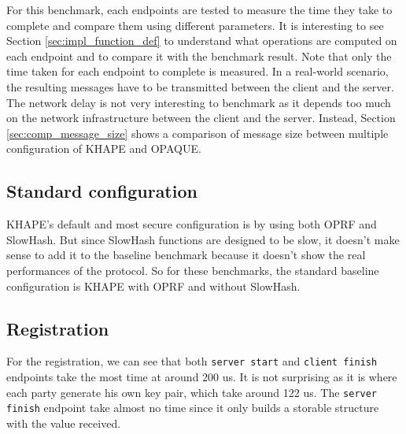 ﻿\documentclass[../report.tex]{subfiles}
\begin{document}
For this benchmark, each endpoints are tested to measure the time they take to complete and compare them using different parameters. 
It is interesting to see Section \ref{sec:impl_function_def} to understand what operations are computed on each endpoint and to compare it with the benchmark result.
Note that only the time taken for each endpoint to complete is measured. In a real-world scenario, the resulting messages have to be transmitted between the client and the server. The network delay is not very interesting to benchmark as it depends too much on the network infrastructure between the client and the server. Instead, Section \ref{sec:comp_message_size} shows a comparison of message size between multiple configuration of KHAPE and OPAQUE.


\subsection{Standard configuration}
KHAPE's default and most secure configuration is by using both OPRF and SlowHash. 
But since SlowHash functions are designed to be slow, it doesn't make sense to add it to the baseline benchmark because it doesn't show the real performances of the protocol.
So for these benchmarks, the standard baseline configuration is KHAPE with OPRF and without SlowHash.


\pgfplotsset{width=\textwidth-1.1cm}


\subsection*{Registration}
For the registration, we can see that both \verb|server start| and \verb|client finish| endpoints take the most time at around 200 us.
It is not surprising as it is where each party generate his own key pair, which take around 122 us.
The \verb|server finish| endpoint take almost no time since it only builds a storable structure with the value received.


\end{document}
